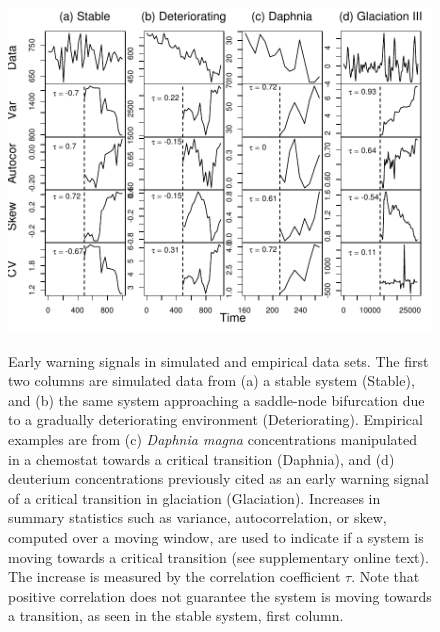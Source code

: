 \documentclass{pnastwo}
\begin{document}
 \begin{figure}
   \begin{center}
     \includegraphics[width=\linewidth]{Fig2}
     \label{fig2}
     \caption{Early warning signals in simulated and empirical data sets.  The first two columns are simulated data from (a) a stable system (Stable), and (b) the same system approaching a saddle-node bifurcation due to a gradually deteriorating environment (Deteriorating).  Empirical examples are from (c) \emph{Daphnia magna} concentrations manipulated in a chemostat towards a critical transition (Daphnia), and (d) deuterium concentrations previously cited as an early warning signal of a critical transition in glaciation (Glaciation). Increases in summary statistics such as variance, autocorrelation, or skew, computed over a moving window, are used to indicate if a system is moving towards a critical transition (see supplementary online text).  The increase is measured by the correlation coefficient $\tau$.  Note that positive correlation does not guarantee the system is moving towards a transition, as seen in the stable system, first column.}
  \end{center}
 \end{figure}
\end{document}

